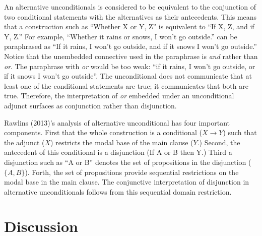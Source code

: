\documentclass[oneside]{report}
\theoremstyle{definition}
\theoremstyle{definition}
\theoremstyle{definition}
\theoremstyle{remark}
\begin{document}
An alternative unconditionals is considered to be equivalent to the
conjunction of two conditional statements with the alternatives as their
antecedents. This means that a construction such as ``Whether X or Y,
Z'' is equivalent to ``If X, Z, and if Y, Z.'' For example, ``Whether it
rains or snows, I won't go outside.'' can be paraphrased as ``If it
rains, I won't go outside, and if it snows I won't go outside.'' Notice
that the unembedded connective used in the paraphrase is \emph{and}
rather than \emph{or}. The paraphrase with \emph{or} would be too weak:
``if it rains, I won't go outside, or if it snows I won't go outside''.
The unconditional does not communicate that at least one of the
conditional statements are true; it communicates that both are true.
Therefore, the interpretation of \emph{or} embedded under an
unconditional adjunct surfaces as conjunction rather than disjunction.

Rawlins (2013)'s analysis of alternative unconditional has four
important components. First that the whole construction is a conditional
(\(X\rightarrow Y\)) such that the adjunct (\(X\)) restricts the modal
base of the main clause (\(Y\).) Second, the antecedent of this
conditional is a disjunction (If A or B then Y.) Third a disjunction
such as ``A or B'' denotes the set of propositions in the disjunction
(\(\{A, B\}\)). Forth, the set of propositions provide sequential
restrictions on the modal base in the main clause. The conjunctive
interpretation of disjunction in alternative unconditionals follows from
this sequential domain restriction.

\section{Discussion}\label{discussion}
\end{document}
